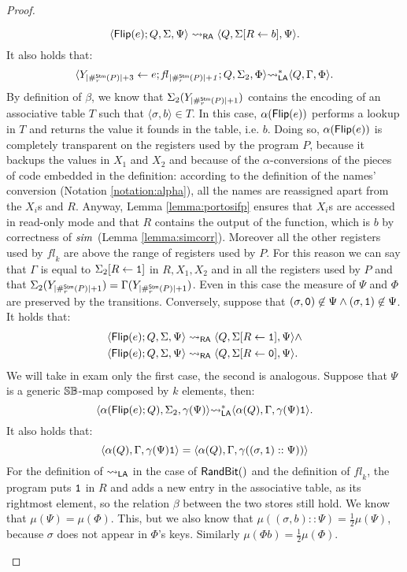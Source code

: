 \begin{proof}
\begin{itemize}
     $$
     \langle \mathsf{Flip(}e\mathsf{)};Q, \Sigma, \Psi\rangle \leadsto_{\mathsf{RA}} \langle Q, \Sigma[R \leftarrow b], \Psi\rangle.
     $$
     It also holds that:
     $$
     \langle Y_{|\#_r^{\mathsf{Stm}}(P)|+3}\leftarrow e; \mathit{fl_{\,|\#_r^{\mathsf{Stm}}(P)|+1}}; Q, \Sigma_2, \Phi\rangle
     {\leadsto_{\mathsf{LA}}^{*}}
     \langle Q, \Gamma, \Phi\rangle.
     $$
     By definition of $\beta$, we know that $\Sigma_2({Y_{|\#_r^{\mathsf{Stm}}(P)|+1}})$
     contains the encoding of an associative table $T$ such that
     $\langle \sigma, b\rangle \in T$. In this case,
     $\alpha(\mathsf{Flip(}e\mathsf{)})$ performs a lookup in $T$ and returns the value it founds
     in the table, i.e. $b$. Doing so, $\alpha(\mathsf{Flip(}e\mathsf{)})$ is completely transparent
     on the registers used by the program $P$, because it backups the values in
     $X_1$ and $X_2$ and because of the $\alpha$-conversions of the pieces of
     code embedded in the definition: according to the definition of the names'
     conversion (Notation \ref{notation:alpha}), all the names
     are reassigned apart from the $X_i$s and $R$. Anyway, Lemma
     \ref{lemma:portosifp} ensures that $X_i$s are accessed in read-only mode
     and that $R$ contains the output of the function, which is $b$
     by correctness of $\mathit{sim}$ (Lemma \ref{lemma:simcorr}).
     Moreover all the other registers used by $\mathit{fl}_k$
     are above the range of registers used by $P$.
     For this reason we can say that $\Gamma$ is
     equal to $\Sigma_2[R \leftarrow \mathtt{1}]$ in $R, X_1, X_2$ and in all the registers used
     by $P$ and that
     $\Sigma_2({Y_{|\#_r^{\mathsf{Stm}}(P)|+1}})=\Gamma({Y_{|\#_r^{\mathsf{Stm}}(P)|+1}})$.
     Even in this case the measure of $\Psi$ and $\Phi$
     are preserved by the transitions.
     Conversely, suppose that $(\sigma, \mathtt{0})\not \in \Psi \land(\sigma, \mathtt{1})\not \in \Psi$.
     It holds that:
     \begin{align*}
     &\langle \mathsf{Flip(}e\mathsf{)};Q, \Sigma, \Psi\rangle \leadsto_{\mathsf{RA}} \langle Q, \Sigma[R \leftarrow \mathtt{1}], \Psi\rangle \land\\
     &\langle \mathsf{Flip(}e\mathsf{)};Q, \Sigma, \Psi\rangle \leadsto_{\mathsf{RA}} \langle Q, \Sigma[R \leftarrow \mathtt{0}], \Psi\rangle.
     \end{align*}
     We will take in exam only the first case, the second is analogous.
     Suppose that $\Psi$ is a generic $\mathbb{S}\mathbb{B}$-map composed by $k$ elements, then:
     $$
     \langle \alpha(\mathsf{Flip(}e\mathsf{)};Q), \Sigma_2, \gamma(\Psi)\rangle {\leadsto_{\mathsf{LA}}^{*}} \langle \alpha(Q), \Gamma, \gamma(\Psi)\mathtt{1}\rangle.
     $$
     It also holds that:
     $$
     \langle \alpha(Q), \Gamma, \gamma(\Psi)\mathtt{1}\rangle=\langle \alpha(Q), \Gamma, \gamma((\sigma, \mathtt{1})::\Psi))\rangle
     $$
     For the definition of ${\leadsto_{\mathsf{LA}}}$ in the case of $\mathsf{RandBit()}$ and
     the definition of $\mathit{fl}_k$, the program puts $\mathtt{1}$ in $R$ and
     adds a new entry in
     the associative table, as its rightmost element, so the
     relation $\beta$ between the two stores still hold.
     We know that $\mu(\Psi)= \mu(\Phi)$. This, but we also know that
     $\mu((\sigma, b)::\Psi)= \frac 1 2 \mu(\Psi)$, because $\sigma$ does not
     appear in $\Phi$'s keys. Similarly $\mu(\Phi b)=\frac 1 2\mu(\Phi)$.
     \qedhere
  \end{itemize}
\end{proof}

